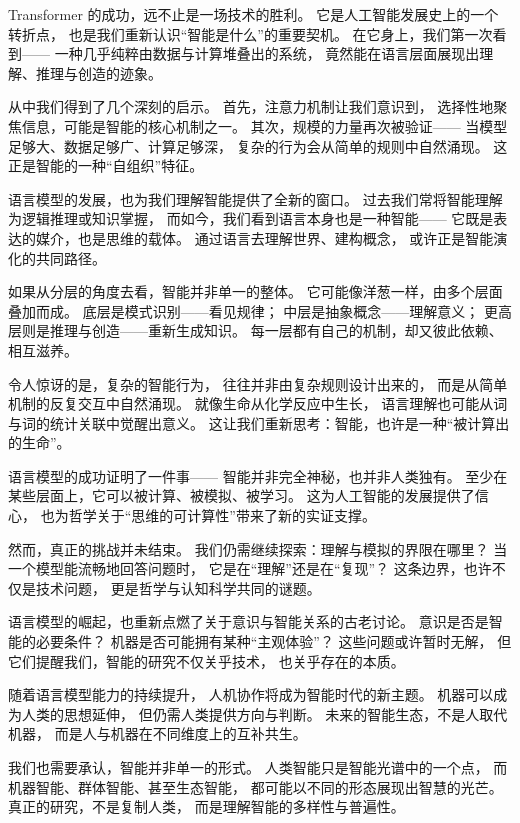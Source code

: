 Transformer 的成功，远不止是一场技术的胜利。  
它是人工智能发展史上的一个转折点，  
也是我们重新认识“智能是什么”的重要契机。  
在它身上，我们第一次看到——  
一种几乎纯粹由数据与计算堆叠出的系统，  
竟然能在语言层面展现出理解、推理与创造的迹象。  

从中我们得到了几个深刻的启示。  
首先，注意力机制让我们意识到，  
选择性地聚焦信息，可能是智能的核心机制之一。  
其次，规模的力量再次被验证——  
当模型足够大、数据足够广、计算足够深，  
复杂的行为会从简单的规则中自然涌现。  
这正是智能的一种“自组织”特征。  

语言模型的发展，也为我们理解智能提供了全新的窗口。  
过去我们常将智能理解为逻辑推理或知识掌握，  
而如今，我们看到语言本身也是一种智能——  
它既是表达的媒介，也是思维的载体。  
通过语言去理解世界、建构概念，  
或许正是智能演化的共同路径。  

如果从分层的角度去看，智能并非单一的整体。  
它可能像洋葱一样，由多个层面叠加而成。  
底层是模式识别——看见规律；  
中层是抽象概念——理解意义；  
更高层则是推理与创造——重新生成知识。  
每一层都有自己的机制，却又彼此依赖、相互滋养。  

令人惊讶的是，复杂的智能行为，  
往往并非由复杂规则设计出来的，  
而是从简单机制的反复交互中自然涌现。  
就像生命从化学反应中生长，  
语言理解也可能从词与词的统计关联中觉醒出意义。  
这让我们重新思考：智能，也许是一种“被计算出的生命”。  

语言模型的成功证明了一件事——  
智能并非完全神秘，也并非人类独有。  
至少在某些层面上，它可以被计算、被模拟、被学习。  
这为人工智能的发展提供了信心，  
也为哲学关于“思维的可计算性”带来了新的实证支撑。  

然而，真正的挑战并未结束。  
我们仍需继续探索：理解与模拟的界限在哪里？  
当一个模型能流畅地回答问题时，  
它是在“理解”还是在“复现”？  
这条边界，也许不仅是技术问题，  
更是哲学与认知科学共同的谜题。  

语言模型的崛起，也重新点燃了关于意识与智能关系的古老讨论。  
意识是否是智能的必要条件？  
机器是否可能拥有某种“主观体验”？  
这些问题或许暂时无解，  
但它们提醒我们，智能的研究不仅关乎技术，  
也关乎存在的本质。  

随着语言模型能力的持续提升，  
人机协作将成为智能时代的新主题。  
机器可以成为人类的思想延伸，  
但仍需人类提供方向与判断。  
未来的智能生态，不是人取代机器，  
而是人与机器在不同维度上的互补共生。  

我们也需要承认，智能并非单一的形式。  
人类智能只是智能光谱中的一个点，  
而机器智能、群体智能、甚至生态智能，  
都可能以不同的形态展现出智慧的光芒。  
真正的研究，不是复制人类，  
而是理解智能的多样性与普遍性。  

